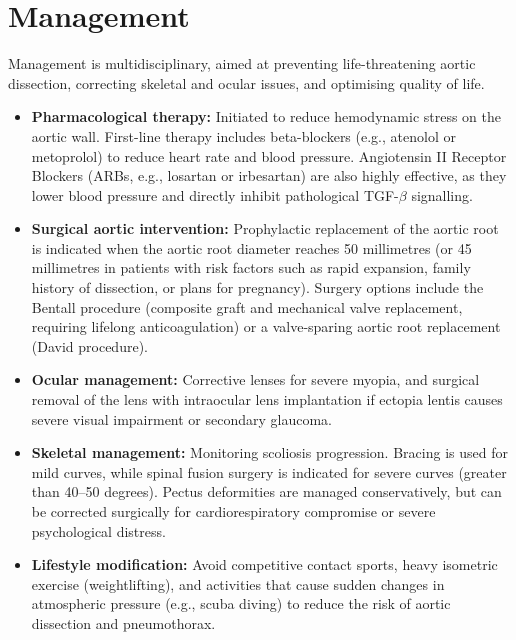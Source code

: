 \section*{Management}
Management is multidisciplinary, aimed at preventing life-threatening aortic dissection, correcting skeletal and ocular issues, and optimising quality of life.
\begin{itemize}
    \item \textbf{Pharmacological therapy:} Initiated to reduce hemodynamic stress on the aortic wall. First-line therapy includes beta-blockers (e.g., atenolol or metoprolol) to reduce heart rate and blood pressure. Angiotensin II Receptor Blockers (ARBs, e.g., losartan or irbesartan) are also highly effective, as they lower blood pressure and directly inhibit pathological TGF-$\beta$ signalling.
    \item \textbf{Surgical aortic intervention:} Prophylactic replacement of the aortic root is indicated when the aortic root diameter reaches 50 millimetres (or 45 millimetres in patients with risk factors such as rapid expansion, family history of dissection, or plans for pregnancy). Surgery options include the Bentall procedure (composite graft and mechanical valve replacement, requiring lifelong anticoagulation) or a valve-sparing aortic root replacement (David procedure).
    \item \textbf{Ocular management:} Corrective lenses for severe myopia, and surgical removal of the lens with intraocular lens implantation if ectopia lentis causes severe visual impairment or secondary glaucoma.
    \item \textbf{Skeletal management:} Monitoring scoliosis progression. Bracing is used for mild curves, while spinal fusion surgery is indicated for severe curves (greater than 40--50 degrees). Pectus deformities are managed conservatively, but can be corrected surgically for cardiorespiratory compromise or severe psychological distress.
    \item \textbf{Lifestyle modification:} Avoid competitive contact sports, heavy isometric exercise (weightlifting), and activities that cause sudden changes in atmospheric pressure (e.g., scuba diving) to reduce the risk of aortic dissection and pneumothorax.
\end{itemize}

